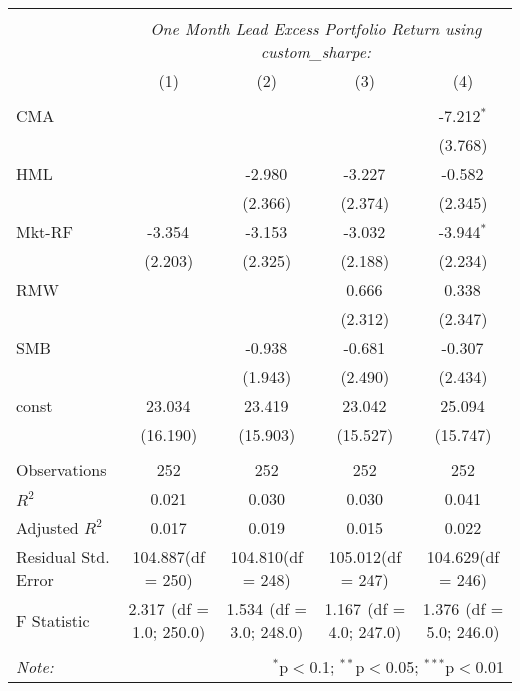 \begin{table}[!htbp] \centering
\begin{tabular}{@{\extracolsep{5pt}}lcccc}
\\[-1.8ex]\hline
\hline \\[-1.8ex]
& \multicolumn{4}{c}{\textit{One Month Lead Excess Portfolio Return using custom_sharpe:}} \
\cr \cline{4-5}
\\[-1.8ex] & (1) & (2) & (3) & (4) \\
\hline \\[-1.8ex]
 CMA & & & & -7.212$^{*}$ \\
  & & & & (3.768) \\
 HML & & -2.980$^{}$ & -3.227$^{}$ & -0.582$^{}$ \\
  & & (2.366) & (2.374) & (2.345) \\
 Mkt-RF & -3.354$^{}$ & -3.153$^{}$ & -3.032$^{}$ & -3.944$^{*}$ \\
  & (2.203) & (2.325) & (2.188) & (2.234) \\
 RMW & & & 0.666$^{}$ & 0.338$^{}$ \\
  & & & (2.312) & (2.347) \\
 SMB & & -0.938$^{}$ & -0.681$^{}$ & -0.307$^{}$ \\
  & & (1.943) & (2.490) & (2.434) \\
 const & 23.034$^{}$ & 23.419$^{}$ & 23.042$^{}$ & 25.094$^{}$ \\
  & (16.190) & (15.903) & (15.527) & (15.747) \\
\hline \\[-1.8ex]
 Observations & 252 & 252 & 252 & 252 \\
 $R^2$ & 0.021 & 0.030 & 0.030 & 0.041 \\
 Adjusted $R^2$ & 0.017 & 0.019 & 0.015 & 0.022 \\
 Residual Std. Error & 104.887(df = 250) & 104.810(df = 248) & 105.012(df = 247) & 104.629(df = 246)  \\
 F Statistic & 2.317$^{}$ (df = 1.0; 250.0) & 1.534$^{}$ (df = 3.0; 248.0) & 1.167$^{}$ (df = 4.0; 247.0) & 1.376$^{}$ (df = 5.0; 246.0) \\
\hline
\hline \\[-1.8ex]
\textit{Note:} & \multicolumn{4}{r}{$^{*}$p$<$0.1; $^{**}$p$<$0.05; $^{***}$p$<$0.01} \\
\end{tabular}
\end{table}

